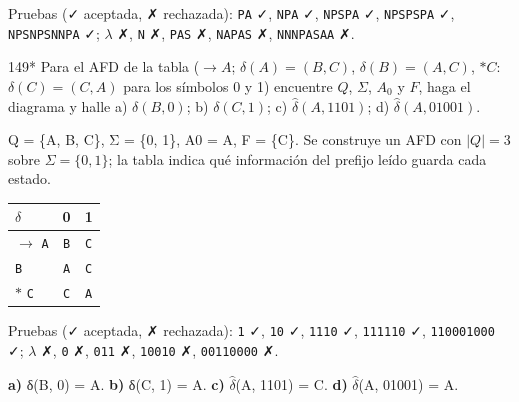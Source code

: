 \documentclass[11pt]{article}
\begin{document}
Pruebas (✓ aceptada, ✗ rechazada): \texttt{PA} ✓, \texttt{NPA} ✓, \texttt{NPSPA} ✓, \texttt{NPSPSPA} ✓, \texttt{NPSNPSNNPA} ✓; $\lambda$ ✗, \texttt{N} ✗, \texttt{PAS} ✗, \texttt{NAPAS} ✗, \texttt{NNNPASAA} ✗.



\begin{ejercicio}{149}{*}
Para el AFD de la tabla ($\to A$; $\delta(A)=(B, C)$, $\delta(B)=(A, C)$, $*C$: $\delta(C)=(C, A)$ para los símbolos 0 y 1) encuentre $Q$, $\Sigma$, $A_0$ y $F$, haga el diagrama y halle a) $\delta(B, 0)$; b) $\delta(C, 1)$; c) $\hat\delta(A, 1101)$; d) $\hat\delta(A, 01001)$.
\end{ejercicio}
\proc Q = \{A, B, C\}, Σ = \{0, 1\}, A0 = A, F = \{C\}. Se construye un AFD con $|Q| = 3$ sobre $\Sigma = \{0, 1\}$; la tabla indica qué información del prefijo leído guarda cada estado.
\begin{center}\small\begin{tabular}{lcc}\toprule
$\delta$ & 0 & 1 \\\midrule
$\to$ \texttt{A} & \texttt{B} & \texttt{C} \\
 \texttt{B} & \texttt{A} & \texttt{C} \\
$*$ \texttt{C} & \texttt{C} & \texttt{A} \\
\bottomrule\end{tabular}\end{center}
Pruebas (✓ aceptada, ✗ rechazada): \texttt{1} ✓, \texttt{10} ✓, \texttt{1110} ✓, \texttt{111110} ✓, \texttt{110001000} ✓; $\lambda$ ✗, \texttt{0} ✗, \texttt{011} ✗, \texttt{10010} ✗, \texttt{00110000} ✗.


\textbf{a)} δ(B, 0) = A. \textbf{b)} δ(C, 1) = A. \textbf{c)} $\hat{\delta}$(A, 1101) = C. \textbf{d)} $\hat{\delta}$(A, 01001) = A.
\end{document}
